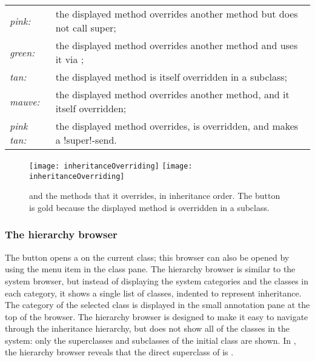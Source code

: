 \documentclass[a4paper,10pt,twoside]{book}
\begin{document}
\begin{tabular}{lp{9cm}}
	\emph{pink:} & the displayed method overrides another method but does not call super;\\
	\emph{green:} & the displayed method overrides another method and uses it via \super;\\
	\emph{tan:} & the displayed method is itself overridden in a subclass;\\
	\emph{mauve:} & the displayed method overrides another method, and it itself overridden;\\
	\emph{pink tan:} & the displayed method overrides, is overridden, and makes a \ct!super!-send.
\end{tabular}

\begin{figure}[tbp]
	\begin{center}
   \ifluluelse
		{\texttt{[image: inheritanceOverriding]}}
		{\texttt{[image: inheritanceOverriding]}}
	\end{center}
	\caption{ and the methods that it overrides, in inheritance order.
	The  button is gold because the displayed method is overridden in a subclass.}
	\label{fig:inheritanceOverriding}
\end{figure}


\subsubsection{The hierarchy browser}
\label{sec:hierarchy}

The  button opens a  on the current class; this browser can also be opened by using the  menu item in the class pane.
The hierarchy browser is similar to the system browser, but instead of displaying the system categories and the classes in each category, it shows a single list of classes, indented to represent inheritance.
The category of the selected class is displayed in the small annotation pane at the top of the browser.
The hierarchy browser is designed to make it easy to navigate through the inheritance hierarchy, but does not show all of the classes in the system: only the superclasses and subclasses of the initial class are shown.
In , the hierarchy browser reveals that the direct superclass of  is .
\end{document}
